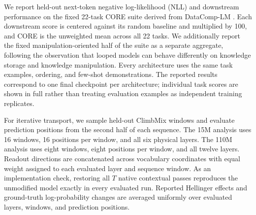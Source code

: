 \documentclass[letterpaper]{article} %
\begin{document}
We report held-out next-token negative log-likelihood (NLL) and downstream
performance on the fixed 22-task CORE suite derived from DataComp-LM
\cite{li2025datacomplmsearchgenerationtraining}. Each downstream score is
centered against its random baseline and multiplied by 100, and CORE is the
unweighted mean across all 22 tasks. We additionally report the fixed
manipulation-oriented half of the suite as a separate aggregate, following the
observation that looped models can behave differently on knowledge storage and
knowledge manipulation. Every architecture uses the same task examples,
ordering, and few-shot demonstrations. The reported results correspond to one
final checkpoint per architecture; individual task scores are shown in full
rather than treating evaluation examples as independent training replicates.

For iterative transport, we sample held-out ClimbMix windows and evaluate
prediction positions from the second half of each sequence. The 15M analysis
uses 16 windows, 16 positions per window, and all six physical layers. The 110M
analysis uses eight windows, eight positions per window, and all twelve layers.
Readout directions are concatenated across vocabulary coordinates with equal
weight assigned to each evaluated layer and sequence window. As an
implementation check, restoring all $T$ native contextual passes reproduces the
unmodified model exactly in every evaluated run. Reported Hellinger effects and
ground-truth log-probability changes are averaged uniformly over evaluated
layers, windows, and prediction positions.
\end{document}
